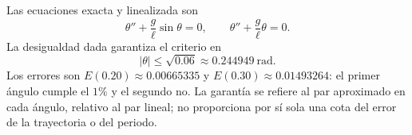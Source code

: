 Las ecuaciones exacta y linealizada son
\[
\theta''+\frac g\ell\sin\theta=0,
\qquad
\theta''+\frac g\ell\theta=0.
\]
La desigualdad dada garantiza el criterio en
\[
|\theta|\le\sqrt{0.06}\approx0.244949\ \mathrm{rad}.
\]
Los errores son \(E(0.20)\approx0.00665335\) y \(E(0.30)\approx0.01493264\): el primer ángulo cumple el \(1\%\) y el segundo no. La garantía se refiere al par aproximado en cada ángulo, relativo al par lineal; no proporciona por sí sola una cota del error de la trayectoria o del periodo.
